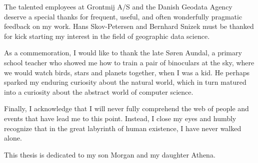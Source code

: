 \documentclass[11pt, oneside]{report}
\begin{document}
The talented employees at Grontmij A/S and the Danish Geodata Agency deserve a special thanks for frequent, useful, and often wonderfully pragmatic feedback on my work. Hans Skov-Petersen and Bernhard Snizek must be thanked for kick starting my interest in the field of geographic data science.

As a commemoration, I would like to thank the late S{\o}ren Aundal, a primary school teacher who showed me how to train a pair of binoculars at the sky, where we would watch birds, stars and planets together, when I was a kid. He perhaps sparked my enduring curiosity about the natural world, which in turn matured into a curiosity about the abstract world of computer science.

Finally, I acknowledge that I will never fully comprehend the web of people and events that have lead me to this point. Instead, I close my eyes and humbly recognize that in the great labyrinth of human existence, I have never walked alone.

This thesis is dedicated to my son Morgan and my daughter Athena.

\tableofcontents
\end{document}
